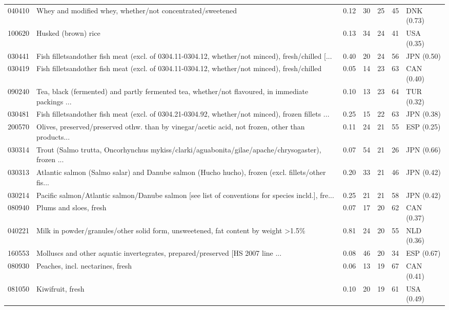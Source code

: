 \begin{tabular}{@{}l p{6.4cm} r r r r l@{}}
040410 & Whey and modified whey, whether/\allowbreak{}not concentrated/\allowbreak{}sweetened & 0.12 & 30 & 25 & 45 & DNK (0.73) \\
100620 & Husked (brown) rice & 0.13 & 34 & 24 & 41 & USA (0.35) \\
030441 & Fish filletsandother fish meat (excl. of 0304.11-0304.12, whether/\allowbreak{}not minced), fresh/\allowbreak{}chilled [... & 0.40 & 20 & 24 & 56 & JPN (0.50) \\
030419 & Fish filletsandother fish meat (excl. of 0304.11-0304.12, whether/\allowbreak{}not minced), fresh/\allowbreak{}chilled & 0.05 & 14 & 23 & 63 & CAN (0.40) \\
090240 & Tea, black (fermented) and partly fermented tea, whether/\allowbreak{}not flavoured, in immediate packings ... & 0.10 & 13 & 23 & 64 & TUR (0.32) \\
030481 & Fish filletsandother fish meat (excl. of 0304.21-0304.92, whether/\allowbreak{}not minced), frozen fillets ... & 0.25 & 15 & 22 & 63 & JPN (0.38) \\
200570 & Olives, preserved/\allowbreak{}preserved othw. than by vinegar/\allowbreak{}acetic acid, not frozen, other than products... & 0.11 & 24 & 21 & 55 & ESP (0.25) \\
030314 & Trout (Salmo trutta, Oncorhynchus mykiss/\allowbreak{}clarki/\allowbreak{}aguabonita/\allowbreak{}gilae/\allowbreak{}apache/\allowbreak{}chrysogaster), frozen ... & 0.07 & 54 & 21 & 26 & JPN (0.66) \\
030313 & Atlantic salmon (Salmo salar) and Danube salmon (Hucho hucho), frozen (excl. fillets/\allowbreak{}other fis... & 0.20 & 33 & 21 & 46 & JPN (0.42) \\
030214 & Pacific salmon/\allowbreak{}Atlantic salmon/\allowbreak{}Danube salmon [see list of conventions for species incld.], fre... & 0.25 & 21 & 21 & 58 & JPN (0.42) \\
080940 & Plums and sloes, fresh & 0.07 & 17 & 20 & 62 & CAN (0.37) \\
040221 & Milk in powder/\allowbreak{}granules/\allowbreak{}other solid form, unsweetened, fat content by weight >1.5\% & 0.81 & 24 & 20 & 55 & NLD (0.36) \\
160553 & Molluscs and other aquatic invertegrates, prepared/\allowbreak{}preserved [HS 2007 line ... & 0.08 & 46 & 20 & 34 & ESP (0.67) \\
080930 & Peaches, incl. nectarines, fresh & 0.06 & 13 & 19 & 67 & CAN (0.41) \\
081050 & Kiwifruit, fresh & 0.10 & 20 & 19 & 61 & USA (0.49) \\
\bottomrule
\end{tabular}
